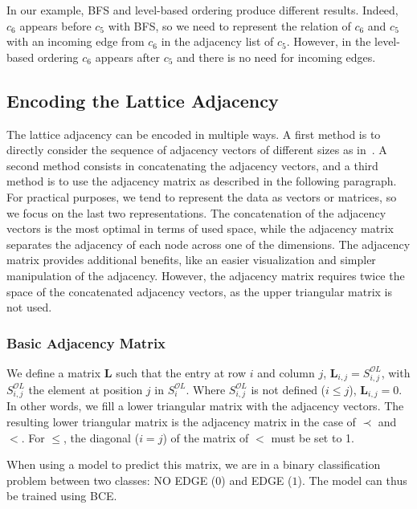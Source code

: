 In our example, BFS and level-based ordering produce different results.
Indeed, $c_6$ appears before $c_5$ with BFS, so we need to represent the relation of $c_6$ and $c_5$ with an incoming edge from $c_6$ in the adjacency list of $c_5$.
However, in the level-based ordering $c_6$ appears after $c_5$ and there is no need for incoming edges.

\subsection{Encoding the Lattice Adjacency\label{sec:enc-adjacency}}
The lattice adjacency can be encoded in multiple ways.
A first method is to directly consider the sequence of adjacency vectors of different sizes as in~\cite{graphrnn:2018:jiaxuan}.
A second method consists in concatenating the adjacency vectors, and a third method is to use the adjacency matrix as described in the following paragraph.
For practical purposes, we tend to represent the data as vectors or matrices, so we focus on the last two representations.
The concatenation of the adjacency vectors is the most optimal in terms of used space, while the adjacency matrix separates the adjacency of each node across one of the dimensions. The adjacency matrix provides additional benefits, like an easier visualization and simpler manipulation of the adjacency. However, the adjacency matrix requires twice the space of the concatenated adjacency vectors, as the upper triangular matrix is not used.

\subsubsection{Basic Adjacency Matrix}
We define a matrix $\mathbf{L}$ such that the entry at row $i$ and column $j$, $\mathbf{L}_{i,j} = S^{\mathcal{O}L}_{i,j}$, with $S^{\mathcal{O}L}_{i,j}$ the element at position $j$ in $S^{\mathcal{O}L}_i$.
Where $S^{\mathcal{O}L}_{i,j}$ is not defined ($i \leq j$), $\mathbf{L}_{i,j} = 0$.
In other words, we fill a lower triangular matrix with the adjacency vectors.
The resulting lower triangular matrix is the adjacency matrix in the case of $\prec$ and $<$.
For $\leq$, the diagonal ($i = j$) of the matrix of $<$ must be set to 1.

When using a model to predict this matrix, we are in a binary classification problem between two classes: NO EDGE ($0$) and EDGE ($1$).
The model can thus be trained using BCE.

